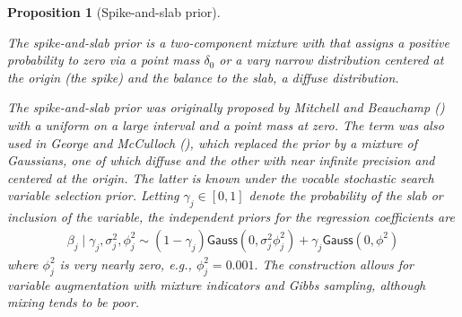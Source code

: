 \documentclass[
  11pt,
  letterpaper,
]{scrbook}
\theoremstyle{definition}
\theoremstyle{definition}
\theoremstyle{definition}
\theoremstyle{plain}
\newtheorem{proposition}{Proposition}[chapter]
\theoremstyle{plain}
\theoremstyle{plain}
\theoremstyle{remark}
\begin{document}
\begin{proposition}[Spike-and-slab
prior]\protect\hypertarget{prp-spike-slab}{}\label{prp-spike-slab}

The spike-and-slab prior is a two-component mixture with that assigns a
positive probability to zero via a point mass \(\delta_0\) or a vary
narrow distribution centered at the origin (the spike) and the balance
to the slab, a diffuse distribution.

The spike-and-slab prior was originally proposed by Mitchell and
Beauchamp () with a uniform
on a large interval and a point mass at zero. The term was also used in
George and McCulloch (), which
replaced the prior by a mixture of Gaussians, one of which diffuse and
the other with near infinite precision and centered at the origin. The
latter is known under the vocable stochastic search variable selection
prior. Letting \(\gamma_j \in [0,1]\) denote the probability of the slab
or inclusion of the variable, the independent priors for the regression
coefficients are \begin{align*}
 \beta_j \mid \gamma_j, \sigma_j^2,\phi^2_j \sim (1-\gamma_j) \mathsf{Gauss}(0, \sigma_j^2\phi^2_j) + \gamma_j \mathsf{Gauss}(0, \phi^2)
\end{align*} where \(\phi^2_j\) is very nearly zero, e.g.,
\(\phi_j^2=0.001.\) The construction allows for variable augmentation
with mixture indicators and Gibbs sampling, although mixing tends to be
poor.

\end{proposition}
\end{document}
